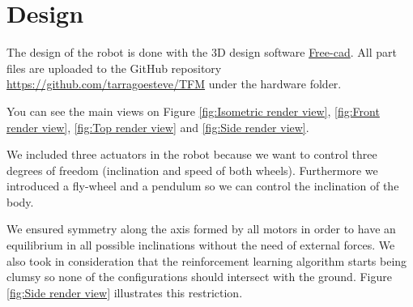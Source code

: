 \section{Design}
The design of the robot is done with the 3D design software \href{https://www.freecadweb.org/}{Free-cad}. All part files are uploaded to the GitHub repository \url{https://github.com/tarragoesteve/TFM} under the hardware folder.

You can see the main views on Figure \ref{fig:Isometric render view}, \ref{fig:Front render view}, \ref{fig:Top render view} and \ref{fig:Side render view}.

We included three actuators in the robot because we want to control three degrees of freedom (inclination and speed of both wheels). Furthermore we introduced a fly-wheel and a pendulum so we can control the inclination of the body. 

We ensured symmetry along the axis formed by all motors in order to have an equilibrium in all possible inclinations without the need of external forces. We also took in consideration that the reinforcement learning algorithm starts being clumsy so none of the configurations should intersect with the ground. Figure \ref{fig:Side render view} illustrates this restriction.   

